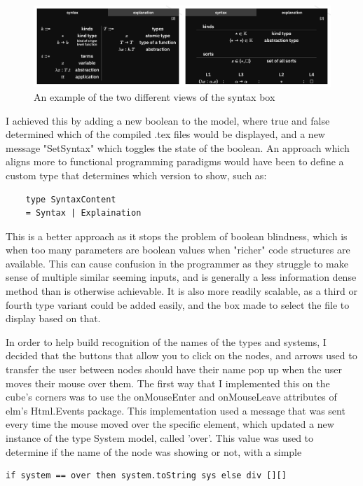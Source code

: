 \documentclass{l4proj}
\begin{document}
\begin{figure}[h!]
    \centering
    \includegraphics[width=0.8\linewidth]{dissertation/images/syntax_collage.png}
    \caption{An example of the two different views of the syntax box}
    \label{fig:enter-label}
\end{figure}

I achieved this by adding a new boolean to the model, where true and false determined which of the compiled .tex files would be displayed, and a new message "SetSyntax" which toggles the state of the boolean.  An approach which aligns more to functional programming paradigms would have been to define a custom type that determines which version to show, such as:

\begin{lstlisting}
    type SyntaxContent
    = Syntax | Explaination
\end{lstlisting}

This is a better approach as it stops the problem of boolean blindness, which is when too many parameters are boolean values when "richer" code structures are available.  This can cause confusion in the programmer as they struggle to make sense of multiple similar seeming inputs, and is generally a less information dense method than is otherwise achievable.  It is also more readily scalable, as a third or fourth type variant could be added easily, and the box made to select the file to display based on that.

In order to help build recognition of the names of the types and systems, I decided that the buttons that allow you to click on the nodes, and arrows used to transfer the user between nodes should have their name pop up when the user moves their mouse over them.  The first way that I implemented this on the cube's corners was to use the onMouseEnter and onMouseLeave attributes of elm's Html.Events package.  This implementation used a message that was sent every time the mouse moved over the specific element, which updated a new instance of the type System model, called 'over'.  This value was used to determine if the name of the node was showing or not, with a simple 
\begin{lstlisting}
if system == over then system.toString sys else div [][]
\end{lstlisting}
\end{document}
